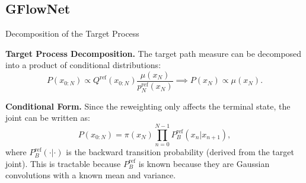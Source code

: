 \documentclass[aspectratio=169,xcolor=dvipsnames]{beamer}
\begin{document}






\subsection{GFlowNet}

\begin{frame}[t]{Decomposition of the Target Process}
\footnotesize

\textbf{Target Process Decomposition.} The target path measure can be decomposed into a product of conditional distributions:
\[
P(x_{0:N}) \propto Q^{\text{ref}}(x_{0:N}) \frac{\mu(x_N)}{p^{\text{ref}}_N(x_N)} \implies P(x_N) \propto \mu(x_N).
\]

\textbf{Conditional Form.} Since the reweighting only affects the terminal state, the joint can be written as:
\[
P(x_{0:N}) = \pi(x_N) \prod_{n=0}^{N-1} P_B^{\text{ref}}(x_n | x_{n+1}),
\]
where $P_B^{\text{ref}}(\cdot | \cdot)$ is the backward transition probability (derived from the target joint). This is tractable because $P_B^{\text{ref}}$ is known because they are Gaussian convolutions with a known mean and variance.


\end{frame}
\end{document}

